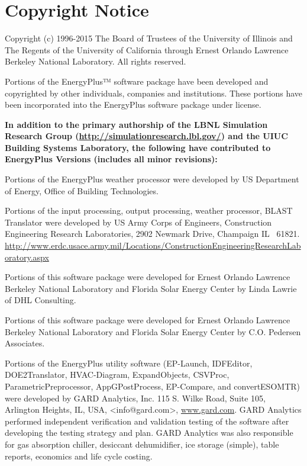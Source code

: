 \section{Copyright Notice}\label{copyright-notice}

Copyright (c) 1996-2015 The Board of Trustees of the University of Illinois and The Regents of the University of California through Ernest Orlando Lawrence Berkeley National Laboratory. All rights reserved.

Portions of the EnergyPlus™ software package have been developed and copyrighted by other individuals, companies and institutions. These portions have been incorporated into the EnergyPlus software package under license.

\textbf{In addition to the primary authorship of the LBNL Simulation Research Group (}\href{http://simulationresearch.lbl.gov/}{\textbf{http://simulationresearch.lbl.gov/}}\textbf{) and the UIUC Building Systems Laboratory, the following have contributed to EnergyPlus Versions (includes all minor revisions):}

Portions of the EnergyPlus weather processor were developed by US Department of Energy, Office of Building Technologies.

Portions of the input processing, output processing, weather processor, BLAST Translator were developed by US Army Corps of Engineers, Construction Engineering Research Laboratories, 2902 Newmark Drive, Champaign IL~ 61821. \url{http://www.erdc.usace.army.mil/Locations/ConstructionEngineeringResearchLaboratory.aspx}

Portions of this software package were developed for Ernest Orlando Lawrence Berkeley National Laboratory and Florida Solar Energy Center by Linda Lawrie of DHL Consulting.

Portions of this software package were developed for Ernest Orlando Lawrence Berkeley National Laboratory and Florida Solar Energy Center by C.O. Pedersen Associates.

Portions of the EnergyPlus utility software (EP-Launch, IDFEditor, DOE2Translator, HVAC-Diagram, ExpandObjects, CSVProc, ParametricPreprocessor, AppGPostProcess, EP-Compare, and convertESOMTR) were developed by GARD Analytics, Inc. 115 S. Wilke Road, Suite 105, Arlington Heights, IL, USA, \textless{}info@gard.com\textgreater{}, \href{http://www.gard.com/}{www.gard.com}. GARD Analytics performed independent verification and validation testing of the software after developing the testing strategy and plan. GARD Analytics was also responsible for gas absorption chiller, desiccant dehumidifier, ice storage (simple), table reports, economics and life cycle costing.

